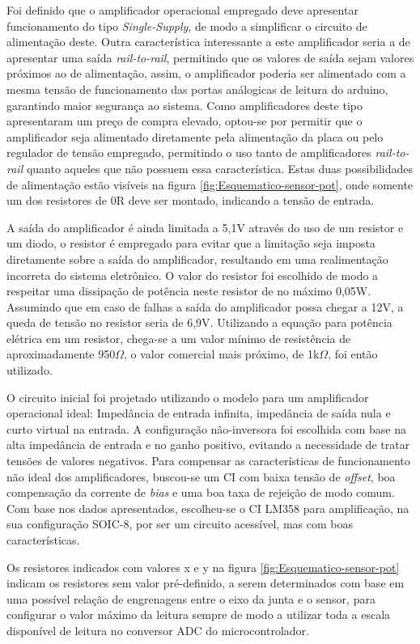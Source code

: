 Foi definido que o amplificador operacional empregado deve apresentar 
funcionamento do tipo \textit{Single-Supply}, de modo a simplificar
o circuito de alimentação deste.
Outra característica interessante a este amplificador seria a de apresentar
uma saída \textit{rail-to-rail}, permitindo que os valores de saída sejam 
valores próximos ao de alimentação, assim, o amplificador poderia ser 
alimentado com a mesma tensão de funcionamento das portas análogicas de leitura
do arduino, garantindo maior segurança ao sistema.
Como amplificadores deste tipo apresentaram um preço
de compra elevado, optou-se por permitir que o amplificador seja alimentado 
diretamente pela alimentação da placa ou pelo regulador de tensão empregado,
permitindo o uso tanto de amplificadores \textit{rail-to-rail} quanto aqueles
que não possuem essa característica. Estas duas possibilidades de alimentação
estão visíveis na figura \ref{fig:Esquematico-sensor-pot}, onde somente um dos 
resistores de 0R deve ser montado, indicando a tensão de entrada.

A saída do amplificador é ainda limitada a 5,1V através do uso de um resistor 
e um diodo, o resistor é empregado para evitar que a limitação seja imposta 
diretamente sobre a saída do amplificador, resultando em uma realimentação
incorreta do sistema eletrônico. O valor do resistor foi escolhido de modo
a respeitar uma dissipação de potência neste resistor de no máximo 0,05W.
Assumindo que em caso de falhas a saída do amplificador possa chegar a 12V, 
a queda de tensão no resistor seria de 6,9V. Utilizando a equação para potência 
elétrica em um resistor, chega-se a um valor mínimo de resistência de aproximadamente
950$\Omega$, o valor comercial mais próximo, de 1k$\Omega$, foi então utilizado.

O circuito inicial foi projetado utilizando o modelo para um amplificador 
operacional ideal: Impedância de entrada infinita, impedância de saída 
nula e curto virtual na entrada. A configuração não-inversora foi 
escolhida com base na alta impedância de entrada e no ganho positivo, evitando 
a necessidade de tratar tensões de valores negativos.
Para compensar as características de funcionamento não ideal dos amplificadores,
buscou-se um CI com baixa tensão de \textit{offset}, boa compensação da
corrente de \textit{bias} e uma boa taxa de rejeição de modo comum.
Com base nos dados apresentados, escolheu-se o CI LM358 para amplificação,
na sua configuração SOIC-8, por ser um circuito acessível, mas com boas
características.

Os resistores indicados com valores x e y na figura \ref{fig:Esquematico-sensor-pot}
indicam os resistores sem valor pré-definido, a serem determinados com base
em uma possível relação de engrenagens entre o eixo da junta e o sensor, para
configurar o valor máximo da leitura sempre de modo a utilizar toda 
a escala disponível de leitura no conversor ADC do microcontrolador.

